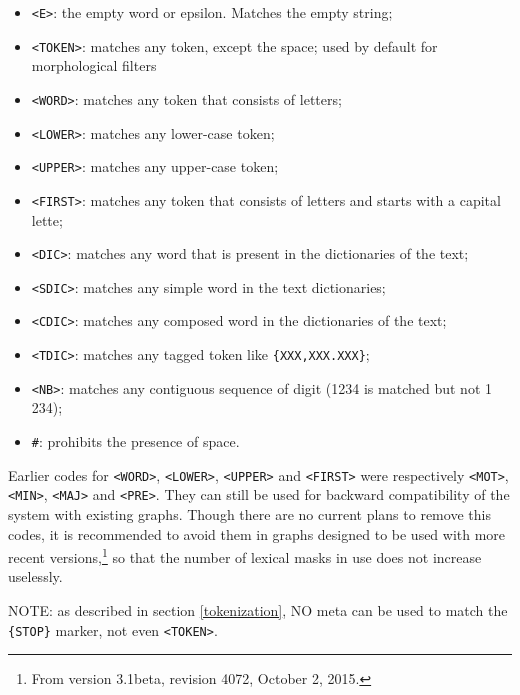 \index{\verbt{\#}}
\begin{itemize}
  \item \verb+<E>+: the empty word or epsilon. Matches the empty string;
  \item \verb+<TOKEN>+: matches any token, except the space; used by default
  for morphological filters
  \item \verb+<WORD>+: matches any token that consists of letters;
  \item \verb+<LOWER>+: matches any lower-case token;
  \item \verb+<UPPER>+: matches any upper-case token;
  \item \verb+<FIRST>+: matches any token that consists of letters and starts
  with a capital lette;
  \item \verb+<DIC>+: matches any word that is present in the dictionaries of
  the text;
  \item \verb+<SDIC>+: matches any simple word in the text
  dictionaries;
  \item \verb+<CDIC>+: matches any composed word in the dictionaries of the
  text;
  \item \verb+<TDIC>+: matches any tagged token like \verb+{XXX,XXX.XXX}+;
  \item \verb+<NB>+: matches any contiguous sequence of digit (1234 is matched
  but not 1 234);
  \item \verb+#+: prohibits the presence of space.
\end{itemize}

\noindent Earlier codes for \verb+<WORD>+, \verb+<LOWER>+, \verb+<UPPER>+ and \verb+<FIRST>+
were respectively \verb+<MOT>+, \verb+<MIN>+, \verb+<MAJ>+ and \verb+<PRE>+.
They can still be used for backward compatibility of the system with existing graphs.
Though there are no current plans to remove this codes, it is recommended to avoid them in graphs designed to be used with
more recent versions,\footnote{From version 3.1beta, revision 4072, October 2, 2015.}
so that the number of lexical masks in use does not increase uselessly.

\bigskip
\noindent NOTE: as described in section \ref{tokenization}, NO meta can be used
to match the \verb+{STOP}+ marker, not even \verb+<TOKEN>+.

